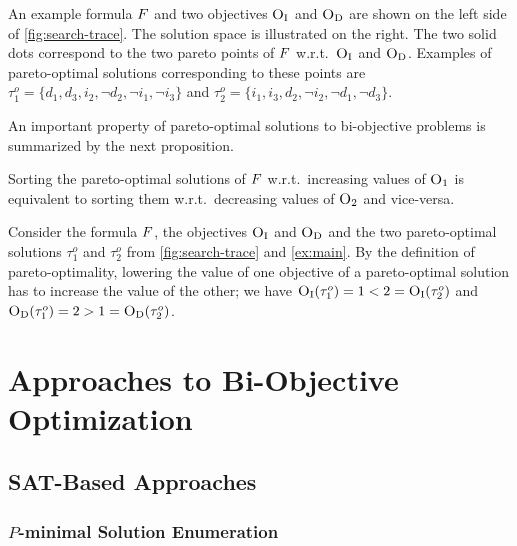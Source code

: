 \begin{example}\label{ex:main}
  An example formula $F$ and two objectives $\textsc{O}_{\text{I}}$ and $\textsc{O}_{\text{D}}$ are shown on the left side of \cref{fig:search-trace}. 
  The solution space is illustrated on the right.
  The two solid dots correspond to the two pareto points of $F$ w.r.t.\ $\textsc{O}_{\text{I}}$ and $\textsc{O}_{\text{D}}$. 
  Examples of pareto-optimal solutions corresponding to these points are $\tau^o_1 = \{d_1, d_3, i_2, \lnot d_2, \lnot i_1, \lnot i_3\}$ and $\tau^o_2 = \{i_1, i_3, d_2, \lnot i_2, \lnot d_1, \lnot d_3\}$.
\end{example}

An important property of pareto-optimal solutions to bi-objective problems is summarized by the next proposition.

\begin{proposition} \label{prop:biobjective}
  Sorting the pareto-optimal solutions of $F$ w.r.t.\ increasing values of $\textsc{O}_1$ is equivalent to sorting them w.r.t.\ decreasing values of $\textsc{O}_2$ and vice-versa.
\end{proposition}

\begin{example}
  Consider the formula $F$, the objectives $\textsc{O}_{\text{I}}$ and $\textsc{O}_{\text{D}}$ and the two pareto-optimal solutions $\tau^o_1$ and $\tau^o_2$ from \cref{fig:search-trace} and \cref{ex:main}.
  By the definition of pareto-optimality, lowering the value of one objective of a pareto-optimal solution has to increase the value of the other;
  we have $\textsc{O}_{\text{I}}(\tau^o_1) = 1 < 2 = \textsc{O}_{\text{I}}(\tau^o_2)$ and $\textsc{O}_{\text{D}}(\tau^o_1) = 2 > 1 = \textsc{O}_{\text{D}}(\tau^o_2)$.
\end{example}

\section{Approaches to Bi-Objective Optimization\label{sec:approaches}}


\subsection{SAT-Based Approaches\label{sec:sat-based}}

\subsubsection{$P$-minimal Solution Enumeration\label{sec:p-minimal}}

